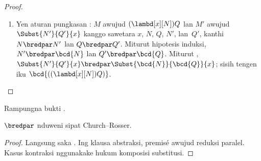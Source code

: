 \documentclass[../../../include/open-logic-section]{subfiles}
\begin{document}
\begin{proof}
\begin{enumerate}
\begin{enumerate}
          miturut ,
          lan sisih tengen iku
          $\bcd{PQ}$ miturut
          .
      \end{enumerate}
    \item Yen aturan pungkasan
      : $M$
      awujud $(\lambd[x][N])Q$
      lan $M'$ awujud
      $\Subst{N'}{Q'}{x}$
      kanggo sawetara $x$,
      $N$, $Q$, $N'$, lan~$Q'$,
      kanthi $N \bredpar N'$
      lan $Q \bredpar Q'$.
      Miturut hipotesis induksi,
      $N' \bredpar \bcd{N}$
      lan $Q' \bredpar \bcd{Q}$.
      Miturut ,
      $\Subst{N'}{Q'}{x} \bredpar
      \Subst{\bcd{N}}{\bcd{Q}}{x}$;
      sisih tengen iku
      $\bcd{((\lambd[x][N])Q)}$.
  \end{enumerate}
\end{proof}

\begin{prob}
  Rampungna bukti .
\end{prob}

\begin{thm}
  $\bredpar$ nduweni
  sipat Church--Rosser.
\end{thm}

\begin{proof}
  Langsung saka . Ing klausa abstraksi, premisé awujud reduksi paralel. Kasus kontraksi nggunakake hukum komposisi substitusi.
\end{proof}
\end{document}

